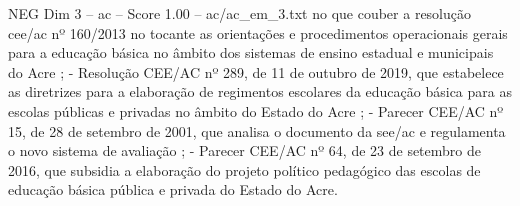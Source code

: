\begin{textsample}{NEG Dim 3 – ac – Score 1.00 – ac/ac\_em\_3.txt}
no que couber a resolução cee/ac nº 160/2013 no tocante as orientações e procedimentos operacionais gerais para a educação básica no âmbito dos sistemas de ensino estadual e municipais do Acre ; - Resolução CEE/AC nº 289, de 11 de outubro de 2019, que estabelece as diretrizes para a elaboração de regimentos escolares da educação básica para as escolas públicas e privadas no âmbito do Estado do Acre ; - Parecer CEE/AC nº 15, de 28 de setembro de 2001, que analisa o documento da see/ac e regulamenta o novo sistema de avaliação ; - Parecer CEE/AC nº 64, de 23 de setembro de 2016, que subsidia a elaboração do projeto político pedagógico das escolas de educação básica pública e privada do Estado do Acre.

\end{textsample}
